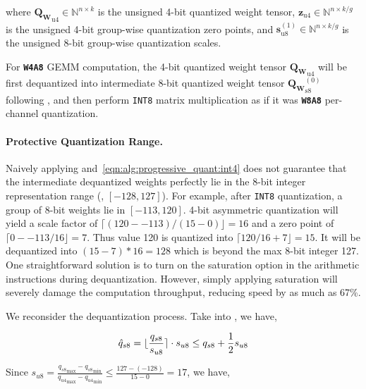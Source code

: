 where ${\mathbf{Q}_{\mathbf{W}}}_{\mathrm{u4}} \in \mathbb{N}^{n \times k}$ is the unsigned 4-bit quantized weight tensor, $\mathbf{z}_{\mathrm{u4}} \in \mathbb{N}^{n \times k / g}$ is the unsigned 4-bit group-wise quantization zero points, and $\mathbf{s}^{(1)}_{\mathrm{u8}} \in \mathbb{N}^{n \times k/g}$ is the unsigned 8-bit group-wise quantization scales.

For \textbf{\texttt{W4A8}} GEMM computation, the 4-bit quantized weight tensor ${\mathbf{Q}_{\mathbf{W}}}_{\mathrm{u4}}$ will be first dequantized into intermediate 8-bit quantized weight tensor ${\mathbf{Q}_{\mathbf{W}}}_{\mathrm{s8}}^{(0)}$ following , and then perform \texttt{INT8} matrix multiplication as if it was \textbf{\texttt{W8A8}} per-channel quantization.

\paragraph{\textbf{Protective Quantization Range.}} Naively applying  and~\ref{eqn:alg:progressive_quant:int4} does not guarantee that the intermediate dequantized weights perfectly lie in the 8-bit integer representation range (\ie, $[-128, 127]$). For example, after \texttt{INT8} quantization, a group of 8-bit weights lie in $[-113, 120]$. 4-bit asymmetric quantization will yield a scale factor of $\lceil (120--113)/(15-0) \rfloor =16$ and a zero point of $\lceil 0 - -113/16 \rfloor = 7$. Thus value 120 is quantized into $\lceil 120/16+7 \rfloor = 15$. It will be dequantized into $(15 - 7) * 16 = 128$ which is beyond the max 8-bit integer 127. One straightforward solution is to turn on the saturation option in the arithmetic instructions during dequantization. However, simply applying saturation will severely damage the computation throughput, reducing speed by as much as 67\%.

We reconsider the dequantization process. Take  into , we have,

\vspace{-18pt}
\begin{equation*}
    \small \hat{q}_{s8} = \lfloor \frac{{q}_{s8}}{{s}_{u8}} \rceil \cdot {{s}_{u8}} \le  {q}_{s8} + \frac{1}{2} {{s}_{u8}}
\end{equation*}
\vspace{-13pt}

Since ${s}_{u8} = \frac{{{q}_{s8}}_{\max} - {{q}_{s8}}_{\min}}{{{q}_{u4}}_{\max} - {{q}_{u4}}_{\min}} \le \frac{127-(-128)}{15-0} = 17$, we have,

